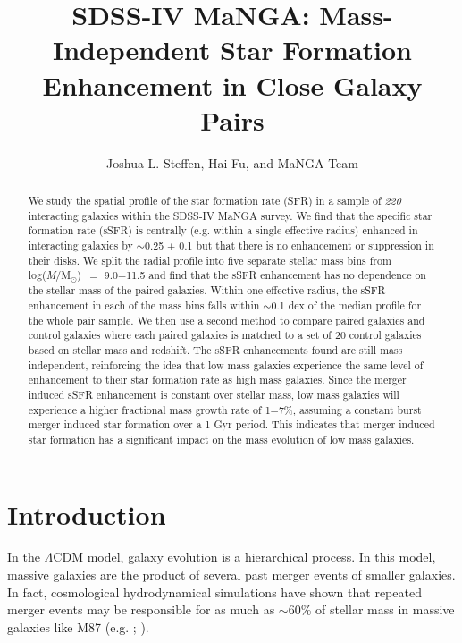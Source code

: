 \documentclass[iop,revtex4,twocolumn,apj,numberedappendix,appendixfloats]{emulateapj}
\newcommand{\logm}{log({\it M}/M$_{\odot}$)}
\begin{document}
\title{
SDSS-IV MaNGA: Mass-Independent Star Formation Enhancement in Close Galaxy Pairs
}

\author{
Joshua L. Steffen, 
Hai Fu, and 
MaNGA Team 
}

\begin{abstract}
We study the spatial profile of the star formation rate (SFR) in a sample of {\it 220} interacting galaxies within the SDSS-IV MaNGA survey. We find that the specific star formation rate (sSFR) is centrally (e.g. within a single effective radius) enhanced in interacting galaxies by $\sim$0.25 $\pm$ 0.1 but that there is no enhancement or suppression in their disks. We split the radial profile into five separate stellar mass bins from \logm\ $=$ 9.0$-$11.5 and find that the sSFR enhancement has no dependence on the stellar mass of the paired galaxies. Within one effective radius, the sSFR enhancement in each of the mass bins falls within $\sim$0.1 dex of the median profile for the whole pair sample. We then use a second method to compare paired galaxies and control galaxies where each paired galaxies is matched to a set of 20 control galaxies based on stellar mass and redshift. The sSFR enhancements found are still mass independent, reinforcing the idea that low mass galaxies experience the same level of enhancement to their star formation rate as high mass galaxies. Since the merger induced sSFR enhancement is constant over stellar mass, low mass galaxies will experience a higher fractional mass growth rate of 1$-$7\%, assuming a constant burst merger induced star formation over a 1 Gyr period. This indicates that merger induced star formation has a significant impact on the mass evolution of low mass galaxies. 

\end{abstract}


\section{Introduction}\label{sec:intro}

In the $\Lambda$CDM model, galaxy evolution is a hierarchical process. In this model, massive galaxies are the product of several past merger events of smaller galaxies. In fact, cosmological hydrodynamical simulations have shown that repeated merger events may be responsible for as much as $\sim$60\% of stellar mass in massive galaxies like M87 (e.g. \citet{Rodriguez-Gomez:2016}; \citet{Pillepich:2018}). 
\end{document}
